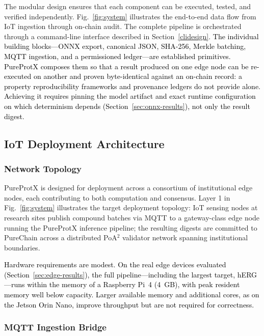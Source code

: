 \documentclass[conference]{IEEEtran}
\begin{document}
The modular design ensures that each component can be executed,
tested, and verified independently.
Fig.~\ref{fig:system} illustrates the end-to-end data flow from
IoT ingestion through on-chain audit.
The complete pipeline is orchestrated through a command-line
interface described in Section~\ref{clidesign}.
\textcolor{black}{The individual building blocks---ONNX export,
canonical JSON, SHA-256, Merkle batching, MQTT ingestion,
and a permissioned ledger---are established primitives.
PureProtX composes them so that a result produced on one
edge node can be re-executed on another and proven
byte-identical against an on-chain record: a property
reproducibility frameworks and provenance ledgers do not
provide alone. Achieving it requires pinning the model
artifact and exact runtime configuration on which
determinism depends (Section~\ref{sec:onnx-results}), not
only the result digest.}

\subsection{\textbf{IoT Deployment Architecture}}
\label{sec:iot-arch}

\subsubsection{Network Topology}

PureProtX is designed for deployment across a consortium of
institutional edge nodes, each contributing to both computation
and consensus. Layer 1 in
Fig.~\ref{fig:system} illustrates the target deployment topology:
IoT sensing nodes at research sites publish compound batches via
MQTT to a gateway-class edge node running the PureProtX inference
pipeline; the resulting digests are committed to PureChain across
a distributed PoA$^2$ validator network spanning institutional
boundaries.

\textcolor{black}{Hardware requirements are modest. On the real
edge devices evaluated (Section~\ref{sec:edge-results}), the
full pipeline---including the largest target, hERG---runs
within the memory of a Raspberry Pi~4 (4~GB), with peak
resident memory well below capacity. Larger available memory
and additional cores, as on the Jetson Orin Nano, improve
throughput but are not required for correctness.}

\subsubsection{MQTT Ingestion Bridge}
\label{sec:mqtt}
\end{document}
